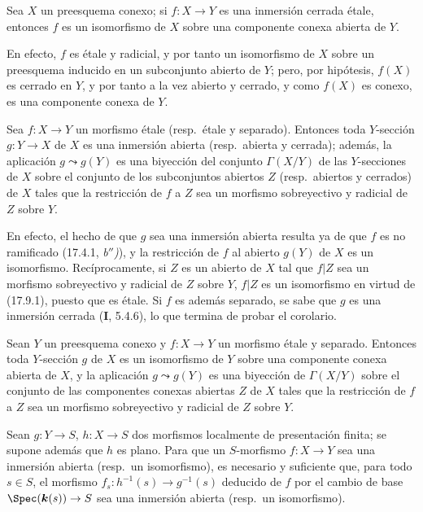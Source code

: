 \begin{corollary}[17.9.2]
\label{IV.17.9.2}
Sea $X$ un preesquema conexo; si $f:X\to Y$ es una inmersión cerrada étale, entonces $f$ es un isomorfismo de $X$ sobre una componente conexa abierta de $Y$.
\end{corollary}

En efecto, $f$ es étale y radicial, y por tanto un isomorfismo de $X$ sobre un preesquema inducido en un subconjunto abierto de $Y$; pero, por hipótesis, $f(X)$ es cerrado en $Y$, y por tanto a la vez abierto y cerrado, y como $f(X)$ es conexo, es una componente conexa de $Y$.

\begin{corollary}[17.9.3]
\label{IV.17.9.3}
Sea $f:X\to Y$ un morfismo étale \textup{(resp.}\ étale y separado\textup{)}. Entonces toda $Y$-sección $g:Y\to X$ de $X$ es una inmersión abierta \textup{(resp.}\ abierta y cerrada\textup{)}; además, la aplicación $g\leadsto g(Y)$ es una biyección del conjunto $\Gamma(X/Y)$ de las $Y$-secciones de $X$ sobre el conjunto de los subconjuntos abiertos $Z$ \textup{(resp.}\ abiertos y cerrados\textup{)} de $X$ tales que la restricción de $f$ a $Z$ sea un morfismo sobreyectivo y radicial de $Z$ sobre $Y$.
\end{corollary}

En efecto, el hecho de que $g$ sea una inmersión abierta resulta ya de que $f$ es no ramificado (17.4.1, \emph{b$''$)}), y la restricción de $f$ al abierto $g(Y)$ de $X$ es un isomorfismo. Recíprocamente, si $Z$ es un abierto de $X$ tal que $f|Z$ sea un morfismo sobreyectivo y radicial de $Z$ sobre $Y$, $f|Z$ es un isomorfismo en virtud de (17.9.1), puesto que es étale. Si $f$ es además separado, se sabe que $g$ es una inmersión cerrada (\textbf I, 5.4.6), lo que termina de probar el corolario.

\begin{corollary}[17.9.4]
\label{IV.17.9.4}
Sean $Y$ un preesquema conexo y $f:X\to Y$ un morfismo étale y separado. Entonces toda $Y$-sección $g$ de $X$ es un isomorfismo de $Y$ sobre una componente conexa abierta de $X$, y la aplicación $g\leadsto g(Y)$ es una biyección de $\Gamma(X/Y)$ sobre el conjunto de las componentes conexas abiertas $Z$ de $X$ tales que la restricción de $f$ a $Z$ sea un morfismo sobreyectivo y radicial de $Z$ sobre $Y$.
\end{corollary}

\begin{corollary}[17.9.5]
\label{IV.17.9.5}
Sean $g:Y\to S$, $h:X\to S$ dos morfismos localmente de presentación finita; se supone además que $h$ es \textup{plano}. Para que un $S$-morfismo $f:X\to Y$ sea una inmersión abierta \textup{(resp.}\ un isomorfismo\textup{)}, es necesario y suficiente que, para todo $s\in S$, el morfismo $f_s:h^{-1}(s)\to g^{-1}(s)$ deducido de $f$ por el cambio de base $\Spec(\boldsymbol{k}(s))\to S$ sea una inmersión abierta \textup{(resp.}\ un isomorfismo\textup{)}.
\end{corollary}


